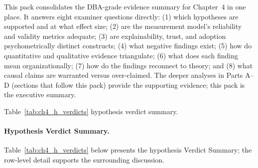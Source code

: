 \noindent This pack consolidates the DBA-grade evidence summary for Chapter~4 in one place. It answers eight examiner questions directly: (1) which hypotheses are supported and at what effect size; (2) are the measurement model's reliability and validity metrics adequate; (3) are explainability, trust, and adoption psychometrically distinct constructs; (4) what negative findings exist; (5) how do quantitative and qualitative evidence triangulate; (6) what does each finding mean organizationally; (7) how do the findings reconnect to theory; and (8) what causal claims are warranted versus over-claimed. The deeper analyses in Parts A--D (sections that follow this pack) provide the supporting evidence; this pack is the executive summary.

\noindent Table~\ref{tab:ch4_h_verdicts} hypothesis verdict summary.

\paragraph{Hypothesis Verdict Summary.}


\noindent Table~\ref{tab:ch4_h_verdicts} below presents the hypothesis Verdict Summary; the row-level detail supports the surrounding discussion.

